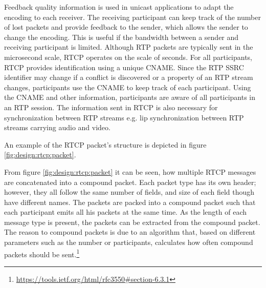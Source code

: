 Feedback quality information is used in unicast applications to adapt the encoding to each receiver. The receiving participant can keep track of the number of lost packets and provide feedback to the sender, which allows the sender to change the encoding. This is useful if the bandwidth between a sender and receiving participant is limited.
Although RTP packets are typically sent in the microsecond scale, RTCP operates on the scale of seconds.
For all participants, RTCP provides identification using a unique \ac{CNAME}.
Since the RTP SSRC identifier may change if a conflict is discovered or a property of an RTP stream changes, participants use the CNAME to keep track of each participant. Using the CNAME and other information, participants are aware of all participants in an RTP session.
The information sent in RTCP is also necessary for synchronization between RTP streams e.g. lip synchronization between RTP streams carrying audio and video.

An example of the RTCP packet's structure is depicted in figure \ref{fig:design:rtcp:packet}.

From figure \ref{fig:design:rtcp:packet} it can be seen, how multiple RTCP messages are concatenated into a compound packet. Each packet type has its own header; however, they all follow the same number of fields, and size of each field though have different names. The packets are packed into a compound packet such that each participant emits all his packets at the same time. As the length of each message type is present, the packets can be extracted from the compound packet. The reason to compound packets is due to an algorithm that, based on different parameters such as the number or participants, calculates how often compound packets should be sent.\footnote{\url{https://tools.ietf.org/html/rfc3550\#section-6.3.1}}

